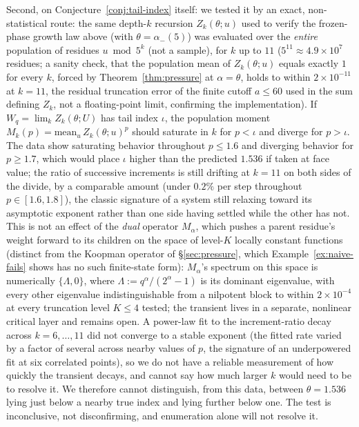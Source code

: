 \documentclass[11pt]{article}
\theoremstyle{remark}
\begin{document}
Second, on Conjecture~\ref{conj:tail-index} itself: we tested it by an
exact, non-statistical route:
the same depth-$k$ recursion $Z_k(\theta;u)$ used to verify the
frozen-phase growth law above (with $\theta=\alpha_-(5)$) was evaluated
over the \emph{entire} population of residues $u\bmod 5^k$ (not a
sample), for $k$ up to $11$ ($5^{11}\approx4.9\times10^7$ residues; a
sanity check, that the population mean of $Z_k(\theta;u)$ equals
exactly $1$ for every $k$, forced by Theorem~\ref{thm:pressure} at
$\alpha=\theta$, holds to within $2\times10^{-11}$ at $k=11$, the
residual truncation error of the finite cutoff $a\le60$ used in the
sum defining $Z_k$, not a floating-point limit, confirming the
implementation). If $W_q=\lim_k Z_k(\theta;U)$ has tail index
$\iota$, the population moment $M_k(p)=\mathrm{mean}_u\,Z_k(\theta;u)^p$
should saturate in $k$ for $p<\iota$ and diverge for $p>\iota$.
The data show saturating behavior throughout $p\le1.6$ and diverging
behavior for $p\ge1.7$, which would place $\iota$ higher than the
predicted $1.536$ if taken at face value; the ratio of
successive increments is still drifting at $k=11$ on both sides of the
divide, by a comparable amount (under $0.2\%$ per step throughout
$p\in[1.6,1.8]$), the classic signature of a system still relaxing
toward its asymptotic exponent rather than one side having settled
while the other has not. This is not an effect of the \emph{dual}
operator $M_\alpha$, which pushes a parent residue's weight forward to
its children on the space of level-$K$ locally constant functions
(distinct from the Koopman operator of \S\ref{sec:pressure}, which
Example~\ref{ex:naive-fails} shows has no such finite-state form):
$M_\alpha$'s spectrum on this space is numerically $\{\Lambda,0\}$,
where $\Lambda:=q^\alpha/(2^\alpha-1)$ is its dominant eigenvalue, with
every other eigenvalue indistinguishable from a nilpotent block to
within $2\times10^{-4}$ at every truncation level $K\le4$ tested; the
transient lives in a separate, nonlinear critical layer and remains
open. A power-law fit
to the increment-ratio decay across $k=6,\ldots,11$ did not converge to
a stable exponent (the fitted rate varied by a factor of several across
nearby values of $p$, the signature of an underpowered fit at six
correlated points), so we do not have a reliable measurement of how
quickly the transient decays, and cannot say how much larger $k$ would
need to be to resolve it. We therefore
cannot distinguish, from this data, between $\theta=1.536$ lying just
below a nearby true index and lying further below one. The test is
inconclusive, not disconfirming, and enumeration alone will not resolve
it.
\end{document}
